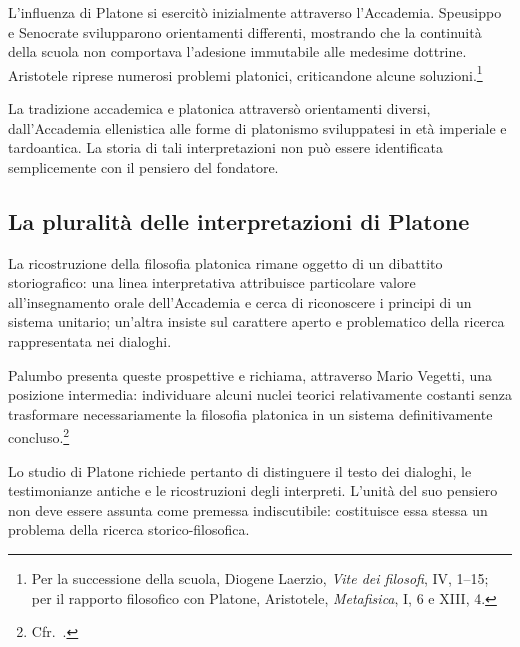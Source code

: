 L'influenza di Platone si esercitò inizialmente attraverso l'Accademia. Speusippo e Senocrate svilupparono orientamenti differenti, mostrando che la continuità della scuola non comportava l'adesione immutabile alle medesime dottrine. Aristotele riprese numerosi problemi platonici, criticandone alcune soluzioni.\footnote{Per la successione della scuola, Diogene Laerzio, \emph{Vite dei filosofi}, IV, 1--15; per il rapporto filosofico con Platone, Aristotele, \emph{Metafisica}, I, 6 e XIII, 4.}

La tradizione accademica e platonica attraversò orientamenti diversi, dall'Accademia ellenistica alle forme di platonismo sviluppatesi in età imperiale e tardoantica. La storia di tali interpretazioni non può essere identificata semplicemente con il pensiero del fondatore.

\subsection{La pluralità delle interpretazioni di Platone}

La ricostruzione della filosofia platonica rimane oggetto di un dibattito storiografico: una linea interpretativa attribuisce particolare valore all'insegnamento orale dell'Accademia e cerca di riconoscere i principi di un sistema unitario; un'altra insiste sul carattere aperto e problematico della ricerca rappresentata nei dialoghi.

Palumbo presenta queste prospettive e richiama, attraverso Mario Vegetti, una posizione intermedia: individuare alcuni nuclei teorici relativamente costanti senza trasformare necessariamente la filosofia platonica in un sistema definitivamente concluso.\footnote{Cfr.\ \cite[109--110]{palumbo2015}.}

Lo studio di Platone richiede pertanto di distinguere il testo dei dialoghi, le testimonianze antiche e le ricostruzioni degli interpreti. L'unità del suo pensiero non deve essere assunta come premessa indiscutibile: costituisce essa stessa un problema della ricerca storico-filosofica.

\printbibliography[heading=none]
